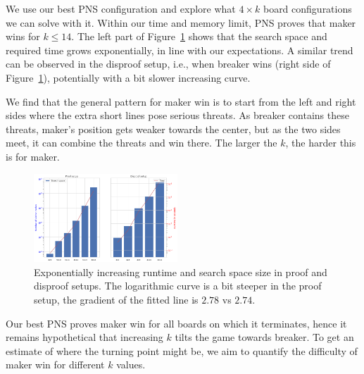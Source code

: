 \documentclass[conference]{IEEEtran}
\theoremstyle{definition}
\begin{document}
\begin{table}[htbp]
\begin{center}
\begin{tabular}{ c | r r | r r }
\hline
\end{tabular}
\label{tab:ablation-1-2}
\end{center}
\end{table}



We use our best PNS configuration and explore what $4\times k$ board configurations we can solve with it. Within our time and memory limit, PNS proves that maker wins for $k \leq 14$. The left part of Figure~\ref{fig:proof_results} shows that the search space and required time grows exponentially, in line with our expectations. A similar trend can be observed in the disproof setup, i.e., when breaker wins (right side of Figure~\ref{fig:proof_results}), potentially with a bit slower increasing curve.


We find that the general pattern for maker win is to start from the left and right sides where the extra short lines pose serious threats. As breaker contains these threats, maker's position gets weaker towards the center, but as the two sides meet, it can combine the threats and win there. The larger the $k$, the harder this is for maker.

\begin{figure}
    \centering
    \includegraphics[width=0.48\textwidth]{papers/cog2021/figures/proof_disproof_best.png}
    \caption{Exponentially increasing runtime and search space size in proof and disproof setups. The logarithmic curve is a bit steeper in the proof setup, the gradient of the fitted line is $2.78$ vs $2.74$.}
    \label{fig:proof_results}
\end{figure}


Our best PNS proves maker win for all boards on which it terminates, hence it remains hypothetical that increasing $k$ tilts the game towards breaker. To get an estimate of where the turning point might be, we aim to quantify the difficulty of maker win for different $k$ values.
\end{document}
